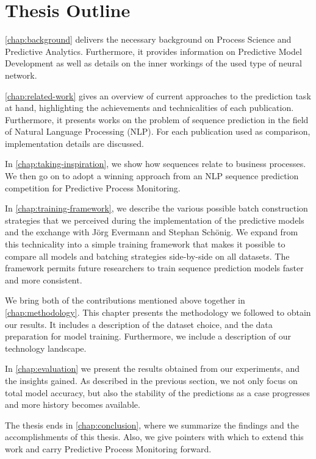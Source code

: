 \section{Thesis Outline}\label{sec:intro:outline}
\autoref{chap:background} delivers the necessary background on Process Science and Predictive Analytics. Furthermore, it provides information on Predictive Model Development as well as details on the inner workings of the used type of neural network.

\autoref{chap:related-work} gives an overview of current approaches to the prediction task at hand, highlighting the achievements and technicalities of each publication. Furthermore, it presents works on the problem of sequence prediction in the field of Natural Language Processing (NLP). For each publication used as comparison, implementation details are discussed.

In \autoref{chap:taking-inspiration}, we show how sequences relate to business processes.
We then go on to adopt a winning approach from an NLP sequence prediction competition for Predictive Process Monitoring.

In \autoref{chap:training-framework}, we describe the various possible batch construction strategies that we perceived during the implementation of the predictive models and the exchange with Jörg Evermann and Stephan Schönig. We expand from this technicality into a simple training framework that makes it possible to compare all models and batching strategies side-by-side on all datasets. The framework permits future researchers to train sequence prediction models faster and more consistent.

We bring both of the contributions mentioned above together in \autoref{chap:methodology}.
This chapter presents the methodology we followed to obtain our results. It includes a description of the dataset choice,
and the data preparation for model training. Furthermore, we include a description of our technology landscape.

In \autoref{chap:evaluation} we present the results obtained from our experiments, and the insights gained. As described in the previous section, we not only focus on total model accuracy, but also the stability of the predictions as a case progresses and more history becomes available.

The thesis ends in \autoref{chap:conclusion}, where we summarize the findings and the accomplishments of this thesis. Also, we give pointers with which to extend this work and carry Predictive Process Monitoring forward.
